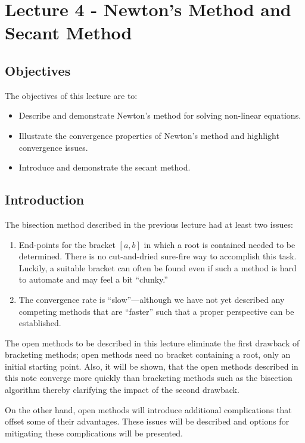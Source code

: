 \chapter{Lecture 4 - Newton's Method and Secant Method}
\label{ch:lec4n}
\section{Objectives}
The objectives of this lecture are to:
\begin{itemize}
\item Describe and demonstrate Newton's method for solving non-linear equations.
\item Illustrate the convergence properties of Newton's method and highlight convergence issues.
\item Introduce and demonstrate the secant method.
\end{itemize}
\setcounter{lstannotation}{0}

\section{Introduction}
The bisection method described in the previous lecture had at least two issues:
\begin{enumerate}
\item End-points for the bracket $\left[a,b\right]$ in which a root is contained needed to be determined.  There is no cut-and-dried sure-fire way to accomplish this task.  Luckily, a suitable bracket can often be found even if such a method is hard to automate and may feel a bit ``clunky.''

\item The convergence rate is ``slow''---although we have not yet described any competing methods that are ``faster'' such that a proper perspective can be established.
\end{enumerate}
The open methods to be described in this lecture eliminate the first drawback of bracketing methods; open methods need no bracket containing a root, only an initial starting point.  Also, it will be shown, that the open methods described in this note converge more quickly than bracketing methods such as the bisection algorithm thereby clarifying the impact of the second drawback. 

On the other hand, open methods will introduce additional complications that offset some of their advantages.  These issues will be described and options for mitigating these complications will be presented.

